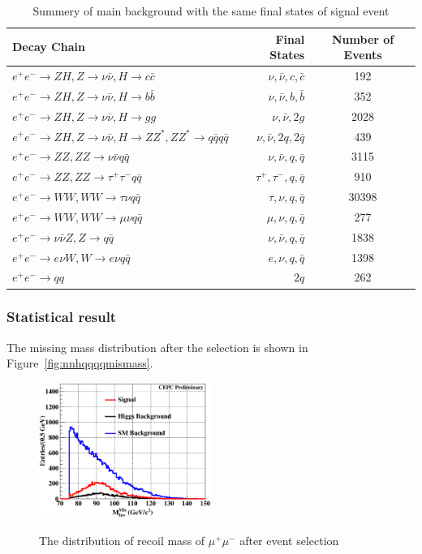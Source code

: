 \documentclass[11pt,a4paper]{cepcnote}
\begin{document}
\begin{table}[H]
\begin{center}
\begin{tabular}{lrc}
\hline\hline
Decay Chain	& Final States 	&	Number of Events\\
\hline
$e^+e^-\rightarrow ZH, Z\rightarrow \nu\bar{\nu}, H\rightarrow c\bar{c}$ & $\nu, \bar{\nu}, c, \bar{c}$			&192	\\
$e^+e^-\rightarrow ZH, Z\rightarrow \nu\bar{\nu}, H\rightarrow b\bar{b}$ & $\nu, \bar{\nu}, b, \bar{b}$			&352	\\
$e^+e^-\rightarrow ZH, Z\rightarrow \nu\bar{\nu}, H\rightarrow gg$ 		 & $\nu, \bar{\nu}, 2g		  $			&2028	\\
$e^+e^-\rightarrow ZH, Z\rightarrow \nu\bar{\nu}, H\rightarrow ZZ^*, ZZ^*\rightarrow q\bar{q}q\bar{q}$ &
																$\nu, \bar{\nu}, 2q, 2\bar{q}$&		439\\	
$e^+e^-\rightarrow ZZ, ZZ\rightarrow \nu\bar{\nu}q\bar{q}$      & $\nu, \bar{\nu}, q, \bar{q}$					&3115	\\
$e^+e^-\rightarrow ZZ, ZZ\rightarrow \tau^+\tau^-q\bar{q}$ 		& $\tau^+, \tau^-, q, \bar{q}$					&910	\\
$e^+e^-\rightarrow WW, WW\rightarrow \tau\nu q\bar{q}$        	& $\tau, \nu, q, \bar{q}$						&	30398\\
$e^+e^-\rightarrow WW, WW\rightarrow \mu\nu q\bar{q}$        	& $\mu, \nu, q, \bar{q}$						&	277\\
$e^+e^-\rightarrow \nu\bar{\nu} Z, Z\rightarrow q\bar{q}$ 		& $\nu, \bar{\nu}, q, \bar{q}$					&	1838\\
$e^+e^-\rightarrow e\nu W, W\rightarrow e\nu q\bar{q}$        	& $e, \nu, q, \bar{q}$							&	1398\\
$e^+e^-\rightarrow qq$											& $2q$											&262 \\
\hline\hline
\end{tabular}
\caption{Summery of main background with the same final states of signal event}
\label{tab:nnqqqqbkg}
\end{center}
\end{table}

\subsubsection{Statistical result}
The missing mass distribution after the selection is shown in
 Figure~\ref{fig:nnhqqqqmismass}.
\begin{figure}[H]
\centering
\includegraphics[width=0.5\textwidth]{nnH/fourq/MisMass_AF}
\label{fig:eehuvqqrecfit}
\caption[]{The distribution of recoil mass of $\mu^+\mu^-$ after event selection}
\end{figure}
\end{document}
